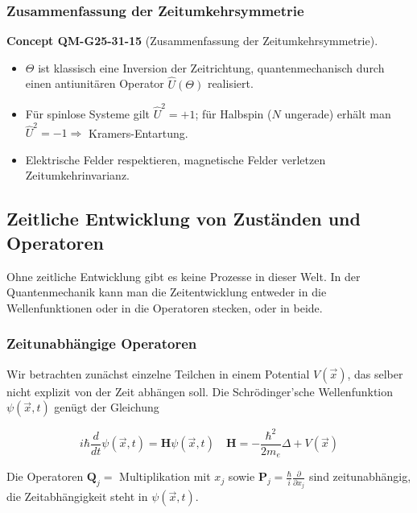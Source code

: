 \documentclass[10pt, letterpaper]{article}
\newcommand{\CustomHeading}[3]{%
  \par\medskip\noindent%
  \textbf{#1 #2} \textnormal{(#3)}.\enskip%
}
\newenvironment{CONC}[2]{\begin{unitbox}\CustomHeading{Concept}{#1}{#2}}{\end{unitbox}}
\begin{document}
\subsubsection*{Zusammenfassung der Zeitumkehrsymmetrie}


\begin{CONC}{QM-G25-31-15}{Zusammenfassung der Zeitumkehrsymmetrie}
\begin{itemize}
  \item $\Theta$ ist klassisch eine Inversion der Zeitrichtung,
        quantenmechanisch durch einen antiunitären
        Operator $\widehat U(\Theta)$ realisiert.
  \item Für spinlose Systeme gilt
        \(\widehat U^{2}=+1\); für
        Halbspin ($N$ ungerade) erhält man
        \(\widehat U^{2}=-1\Rightarrow\) Kramers-Entartung.
  \item Elektrische Felder respektieren, magnetische Felder verletzen
        Zeitumkehrinvarianz.
\end{itemize}
\end{CONC}












\subsection*{Zeitliche Entwicklung von Zuständen und Operatoren}
Ohne zeitliche Entwicklung gibt es keine Prozesse in dieser Welt. In der Quantenmechanik kann man die Zeitentwicklung entweder in die Wellenfunktionen oder in die Operatoren stecken, oder in beide.

\subsubsection*{Zeitunabhängige Operatoren}
Wir betrachten zunächst einzelne Teilchen in einem Potential $V(\vec{x})$, das selber nicht explizit von der Zeit abhängen soll. Die Schrödinger'sche Wellenfunktion $\psi(\vec{x}, t)$ genügt der Gleichung

$$
i \hbar \frac{d}{d t} \psi(\vec{x}, t)=\mathbf{H} \psi(\vec{x}, t) \quad \mathbf{H}=-\frac{\hbar^{2}}{2 m_{e}} \Delta+V(\vec{x})
$$

Die Operatoren $\mathbf{Q}_{j}=$ Multiplikation mit $x_{j}$ sowie $\mathbf{P}_{j}=\frac{\hbar}{i} \frac{\partial}{\partial x_{j}}$ sind zeitunabhängig, die Zeitabhängigkeit steht in $\psi(\vec{x}, t)$.
\end{document}

